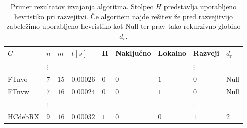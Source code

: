 \documentclass[12pt,a4paper,twoside]{article}
\theoremstyle{definition} %
\theoremstyle{plain} %
\numberwithin{equation}{section}  %
\begin{document}
\begin{table}[]
\caption{Primer rezultatov izvajanja algoritma. Stolpec $H$ predstavlja uporabljeno hevristiko pri razvejitvi. Če algoritem najde rešitev že pred razvejitvijo zabeležimo uporabljeno hevristiko kot Null ter prav tako rekurzivno globino $d_r$.\label{tbl_res_3}}
\begin{tabular}{lllllllll}
\hline
\multicolumn{1}{|l|}{\textbf{$G$}} & \multicolumn{1}{l|}{\textbf{$n$}} & \multicolumn{1}{l|}{\textbf{$m$}} & \multicolumn{1}{l|}{\textbf{$t[s]$}} & \multicolumn{1}{l|}{\textbf{H}} & \multicolumn{1}{l|}{\textbf{Naključno}} & \multicolumn{1}{l|}{\textbf{Lokalno}} & \multicolumn{1}{l|}{\textbf{Razveji}} & \multicolumn{1}{l|}{\textbf{$d_r$}} \\ \hline
  & $\vdots$                          &                                   &                                      &                                 &                                         &                                       & $\vdots$                              &                                     \\ \hline
\multicolumn{1}{|l|}{FTnvo}        & \multicolumn{1}{l|}{$7$}          & \multicolumn{1}{l|}{$15$}         & \multicolumn{1}{l|}{$0.00026$}       & \multicolumn{1}{l|}{0}          & \multicolumn{1}{l|}{$0$}                & \multicolumn{1}{l|}{$1$}              & \multicolumn{1}{l|}{$0$}              & \multicolumn{1}{l|}{Null}           \\ \hline
\multicolumn{1}{|l|}{FTnvw}        & \multicolumn{1}{l|}{$7$}          & \multicolumn{1}{l|}{$16$}         & \multicolumn{1}{l|}{$0.00024$}       & \multicolumn{1}{l|}{0}          & \multicolumn{1}{l|}{$0$}                & \multicolumn{1}{l|}{$1$}              & \multicolumn{1}{l|}{$0$}              & \multicolumn{1}{l|}{Null}           \\ \hline
                                   & $\vdots$                          &                                   &                                      &                                 &                                         &                                       & $\vdots$                              &                                     \\ \hline
\multicolumn{1}{|l|}{HCdebRX}      & \multicolumn{1}{l|}{$9$}          & \multicolumn{1}{l|}{$16$}         & \multicolumn{1}{l|}{$0.00032$}       & \multicolumn{1}{l|}{$1$}        & \multicolumn{1}{l|}{$0$}                & \multicolumn{1}{l|}{$0$}              & \multicolumn{1}{l|}{$1$}              & \multicolumn{1}{l|}{2}              \\ \hline

\end{tabular}
\end{table}
\end{document}
